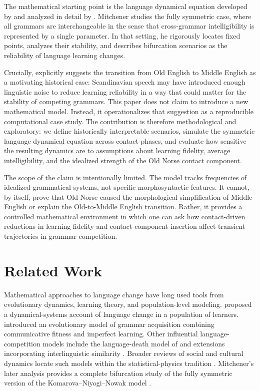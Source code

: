 \documentclass[11pt]{article}
\begin{document}
The mathematical starting point is the language dynamical equation developed by \citet{komarova2001grammar} and analyzed in detail by \citet{mitchener2003bifurcation}. Mitchener studies the fully symmetric case, where all grammars are interchangeable in the sense that cross-grammar intelligibility is represented by a single parameter. In that setting, he rigorously locates fixed points, analyzes their stability, and describes bifurcation scenarios as the reliability of language learning changes.

Crucially, \citet[p.~284]{mitchener2003bifurcation} explicitly suggests the transition from Old English to Middle English as a motivating historical case: Scandinavian speech may have introduced enough linguistic noise to reduce learning reliability in a way that could matter for the stability of competing grammars. This paper does not claim to introduce a new mathematical model. Instead, it operationalizes that suggestion as a reproducible computational case study. The contribution is therefore methodological and exploratory: we define historically interpretable scenarios, simulate the symmetric language dynamical equation across contact phases, and evaluate how sensitive the resulting dynamics are to assumptions about learning fidelity, average intelligibility, and the idealized strength of the Old Norse contact component.

The scope of the claim is intentionally limited. The model tracks frequencies of idealized grammatical systems, not specific morphosyntactic features. It cannot, by itself, prove that Old Norse caused the morphological simplification of Middle English or explain the Old-to-Middle English transition. Rather, it provides a controlled mathematical environment in which one can ask how contact-driven reductions in learning fidelity and contact-component insertion affect transient trajectories in grammar competition.

\section{Related Work}

Mathematical approaches to language change have long used tools from evolutionary dynamics, learning theory, and population-level modeling. \citet{niyogi1997dynamical} proposed a dynamical-systems account of language change in a population of learners. \citet{komarova2001grammar} introduced an evolutionary model of grammar acquisition combining communicative fitness and imperfect learning. Other influential language-competition models include the language-death model of \citet{abramsstrogatz2003language} and extensions incorporating interlinguistic similarity \citep{mira2005interlinguistic}. Broader reviews of social and cultural dynamics locate such models within the statistical-physics tradition \citep{castellano2009statistical}. Mitchener's later analysis provides a complete bifurcation study of the fully symmetric version of the Komarova--Niyogi--Nowak model \citep{mitchener2003bifurcation}.
\end{document}
